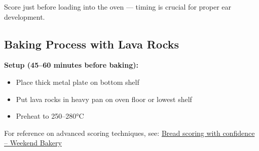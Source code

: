 \documentclass[10pt,a4paper]{article}
\begin{document}
    \begin{criticalbox}
        Score just before loading into the oven --- timing is crucial for proper ear development.
    \end{criticalbox}

    \subsection{Baking Process with Lava Rocks}
    \textbf{Setup (45--60 minutes before baking):}
    \begin{itemize}[leftmargin=*]
        \item Place thick metal plate on bottom shelf
        \item Put lava rocks in heavy pan on oven floor or lowest shelf
        \item Preheat to 250--280°C
    \end{itemize}

    \begin{tipbox}
        For reference on advanced scoring techniques, see: \href{https://www.weekendbakery.com/posts/bread-scoring-with-confidence/}{Bread scoring with confidence – Weekend Bakery}
    \end{tipbox}
\end{document}
